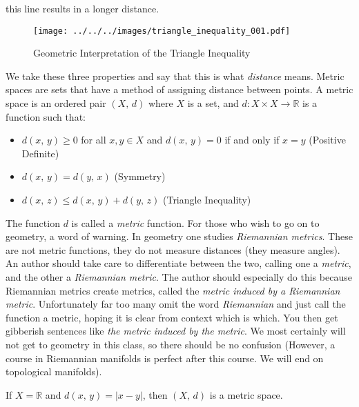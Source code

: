 \documentclass{article}
\theoremstyle{plain}
\theoremstyle{normal}
\newenvironment{example}{%
    \pushQED{\qed}\renewcommand{\qedsymbol}{$\blacksquare$}\examplex%
}{%
    \popQED\endexamplex%
}
\newenvironment{definition}{%
    \pushQED{\qed}\renewcommand{\qedsymbol}{$\blacksquare$}\definitionx%
}{%
    \popQED\enddefinitionx%
}
\begin{document}
        this line results in a longer distance.
        \begin{figure}
            \centering
            \texttt{[image: ../../../images/triangle\_inequality\_001.pdf]}
            \caption{Geometric Interpretation of the Triangle Inequality}
            \label{fig:triangle_inequality_001}
        \end{figure}
        We take these three properties and say that this is what
        \textit{distance} means. Metric spaces are sets that have a method of
        assigning distance between points.
        \begin{definition}[\textbf{Metric Space}]
            A metric space is an ordered pair $(X,\,d)$ where $X$ is a set,
            and $d:X\times{X}\rightarrow\mathbb{R}$ is a function such that:
            \begin{itemize}
                \item $d(x,\,y)\geq{0}$ for all $x,y\in{X}$ and $d(x,\,y)=0$ if
                    and only if $x=y$ (Positive Definite)
                \item $d(x,\,y)=d(y,\,x)$ (Symmetry)
                \item $d(x,\,z)\leq{d}(x,\,y)+d(y,\,z)$ (Triangle Inequality)
            \end{itemize}
            The function $d$ is called a \textit{metric} function.
        \end{definition}
        For those who wish to go on to geometry, a word of warning. In geometry
        one studies \textit{Riemannian metrics}. These are not metric functions,
        they do not measure distances (they measure angles). An author should
        take care to differentiate between the two, calling one a
        \textit{metric}, and the other a \textit{Riemannian metric}. The author
        should especially do this because Riemannian metrics create metrics,
        called the \textit{metric induced by a Riemannian metric}. Unfortunately
        far too many omit the word \textit{Riemannian} and just call the
        function a metric, hoping it is clear from context which is which.
        You then get gibberish sentences like
        \textit{the metric induced by the metric}. We most certainly will not
        get to geometry in this class, so there should be no confusion
        (However, a course in Riemannian manifolds is perfect after this course.
        We will end on topological manifolds).
        \begin{example}
            If $X=\mathbb{R}$ and $d(x,\,y)=|x-y|$, then $(X,\,d)$ is a metric
            space.
        \end{example}
\end{document}
